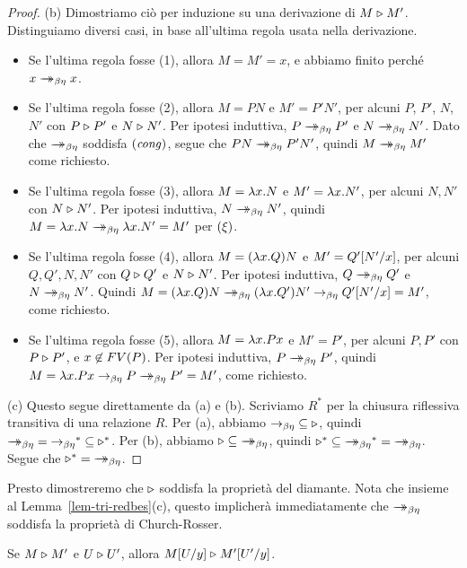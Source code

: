 \documentclass{article}
\begin{document}
\begin{proof}
  (b) Dimostriamo ci\`o per induzione su una derivazione di $M\tri M'$.
  Distinguiamo diversi casi, in base all'ultima regola usata nella
  derivazione.
  \begin{itemize}
  \item Se l'ultima regola fosse (1), allora $M=M'=x$, e abbiamo finito perch\'e
    $x\redbes x$.
  \item Se l'ultima regola fosse (2), allora $M=PN$ e $M'=P'N'$, per alcuni
    $P$, $P'$, $N$, $N'$ con $P\tri P'$ e $N\tri N'$. Per ipotesi
    induttiva, $P\redbes P'$ e $N\redbes N'$. Dato che $\redbes$
    soddisfa $\trule{cong}$, segue che $PN\redbes P'N'$, quindi
    $M\redbes M'$ come richiesto.
  \item Se l'ultima regola fosse (3), allora $M=\lam x.N$ e $M'=\lam
    x.N'$, per alcuni $N,N'$ con $N\tri N'$. Per ipotesi induttiva,
    $N\redbes N'$, quindi $M=\lam x.N\redbes \lam x.N'=M'$ per
    $\nrule{\xi}$. 
  \item Se l'ultima regola fosse (4), allora $M=(\lam x.Q)N$ e
    $M'=\subst{Q'}{N'}{x}$, per alcuni $Q,Q',N,N'$ con $Q\tri Q'$ e
    $N\tri N'$. Per ipotesi induttiva, $Q\redbes Q'$ e $N\redbes
    N'$. Quindi $M=(\lam x.Q)N\redbes(\lam x.Q')N'\redbe
    \subst{Q'}{N'}{x}=M'$, come richiesto.
  \item Se l'ultima regola fosse (5), allora $M=\lam x.Px$ e $M'=P'$, per
    alcuni $P,P'$ con $P\tri P'$, e $x\not\in\FV{P}$. Per ipotesi
    induttiva, $P\redbes P'$, quindi $M=\lam x.Px\redbe P\redbes
    P'=M'$, come richiesto.
  \end{itemize}
  
  (c) Questo segue direttamente da (a) e (b). Scriviamo $R^*$ per
  la chiusura riflessiva transitiva di una relazione $R$. Per (a), abbiamo
  ${\redbe}\seq{\tri}$, quindi ${\redbes}={\redbe}^*\seq{\tri}^*$. Per
  (b), abbiamo ${\tri}\seq{\redbes}$, quindi
  ${\tri}^*\seq{\redbes}^*={\redbes}$. Segue che
  ${\tri}^*={\redbes}$.\eot
\end{proof}

Presto dimostreremo che $\tri$ soddisfa la propriet\`a del diamante. Nota
che insieme al Lemma~\ref{lem-tri-redbes}(c), questo
implicher\`a immediatamente che $\redbes$ soddisfa la propriet\`a di Church-Rosser.

\begin{lemma}[Sostituzione]
Se $M \tri M'$ e $U \tri U'$, allora
$\subst{M}{U}{y} \tri \subst{M'}{U'}{y}$.
\end{lemma}
\end{document}
